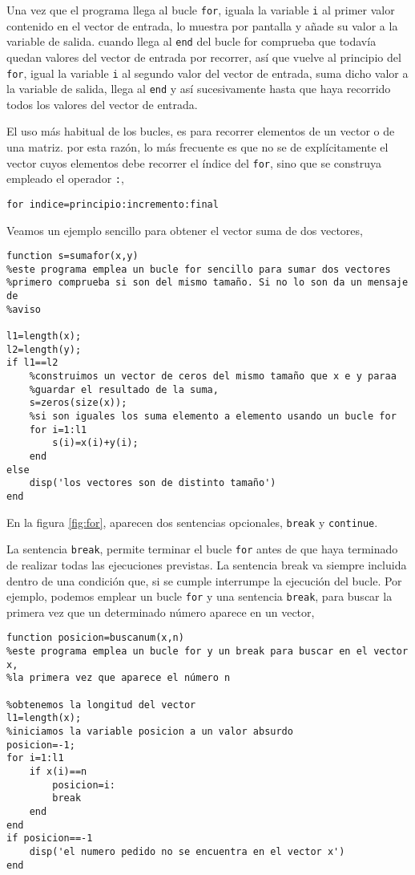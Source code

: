 Una vez que el programa llega al bucle \texttt{for}, iguala la variable \texttt{i} al primer valor contenido en el vector de entrada, lo muestra por pantalla y añade su valor a la variable de salida. cuando llega al \texttt{end} del bucle for comprueba que todavía quedan valores del vector de entrada por recorrer, así que vuelve al principio del \texttt{for}, igual la variable \texttt{i} al segundo valor del vector de entrada, suma dicho valor a la variable de salida, llega al \texttt{end} y así sucesivamente hasta que haya recorrido todos los valores del vector de entrada.

El uso más habitual de los bucles, es para recorrer elementos de un vector o de una matriz. por esta razón, lo más frecuente es que no se de explícitamente el vector cuyos elementos debe recorrer el índice del \texttt{for}, sino que se construya empleado el operador \texttt{:},
\begin{verbatim}
for indice=principio:incremento:final
\end{verbatim}

Veamos un ejemplo sencillo para obtener el vector suma de dos vectores,
\begin{verbatim}
function s=sumafor(x,y)
%este programa emplea un bucle for sencillo para sumar dos vectores
%primero comprueba si son del mismo tamaño. Si no lo son da un mensaje de
%aviso

l1=length(x);
l2=length(y);
if l1==l2
    %construimos un vector de ceros del mismo tamaño que x e y paraa
    %guardar el resultado de la suma,
    s=zeros(size(x));
    %si son iguales los suma elemento a elemento usando un bucle for
    for i=1:l1
        s(i)=x(i)+y(i);
    end
else
    disp('los vectores son de distinto tamaño')
end
\end{verbatim}

En la figura \ref{fig:for}, aparecen dos sentencias opcionales, \texttt{break} y \texttt{continue}.

La sentencia \texttt{break}, permite terminar el bucle \texttt{for} antes de que haya terminado de realizar todas las ejecuciones previstas. La sentencia break va siempre incluida dentro de una condición que, si se cumple interrumpe la ejecución del bucle. Por ejemplo, podemos emplear un bucle \texttt{for} y una sentencia \texttt{break}, para buscar la primera vez que un determinado número aparece en un vector,

\begin{verbatim}
function posicion=buscanum(x,n)
%este programa emplea un bucle for y un break para buscar en el vector x, 
%la primera vez que aparece el número n

%obtenemos la longitud del vector
l1=length(x);
%iniciamos la variable posicion a un valor absurdo
posicion=-1;
for i=1:l1
    if x(i)==n
        posicion=i:
        break
    end
end
if posicion==-1
    disp('el numero pedido no se encuentra en el vector x') 
end
\end{verbatim} 

